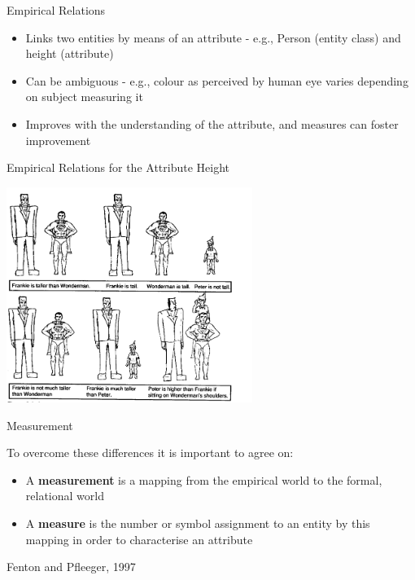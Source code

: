 \documentclass{beamer}
\begin{document}
\begin{frame}{\centerline{Empirical Relations}}

\begin{itemize}
\item  Links two entities by means of an attribute - e.g., Person (entity class) and height (attribute)
\item  Can be ambiguous - e.g., colour as perceived by human eye varies depending on subject measuring it
\item  Improves with the understanding of the attribute, and measures can foster improvement

\end{itemize}

\end{frame}

\begin{frame}{\centerline{Empirical Relations for the Attribute Height
}}

\begin{center}
\includegraphics[width=80mm]{A2022.IDSEPC.SperimentazioneDeduzione/img-img08.png}
\end{center}

\end{frame}

\begin{frame}{\centerline{Measurement}}

To overcome these differences it is important to agree on:

\begin{itemize}
\item  A \textbf{measurement} is a mapping from the empirical world to the formal, relational world
\item  A \textbf{measure} is the number or symbol assignment to an entity by this mapping in order to characterise an attribute
\end{itemize}

\begin{flushright}
Fenton and Pfleeger, 1997
\end{flushright}

\end{frame}
\end{document}
